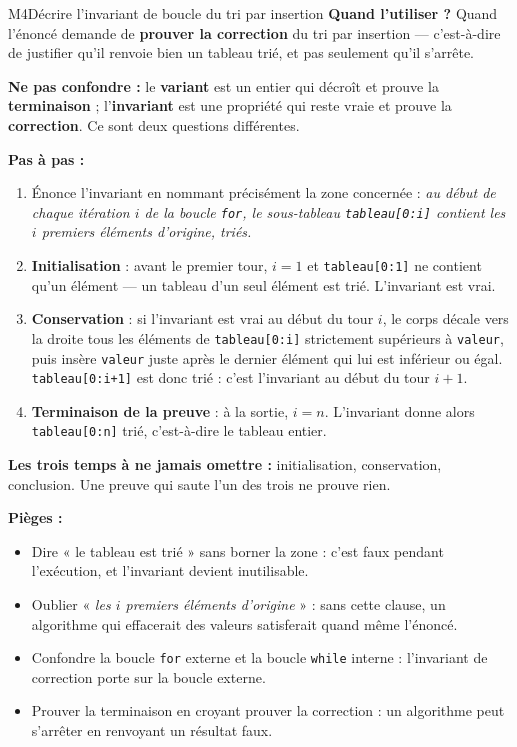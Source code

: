 \begin{fichemethode}{M4}{Décrire l'invariant de boucle du tri par insertion}
\textbf{Quand l'utiliser ?} Quand l'énoncé demande de \textbf{prouver la correction} du tri
par insertion — c'est-à-dire de justifier qu'il renvoie bien un tableau trié, et pas
seulement qu'il s'arrête.

\textbf{Ne pas confondre :} le \textbf{variant} est un entier qui décroît et prouve la
\textbf{terminaison} ; l'\textbf{invariant} est une propriété qui reste vraie et prouve la
\textbf{correction}. Ce sont deux questions différentes.

\textbf{Pas à pas :}
\begin{enumerate}
  \item Énonce l'invariant en nommant précisément la zone concernée : \emph{au début de
    chaque itération $i$ de la boucle \lstinline{for}, le sous-tableau
    \lstinline{tableau[0:i]} contient les $i$ premiers éléments d'origine, triés.}
  \item \textbf{Initialisation} : avant le premier tour, $i=1$ et \lstinline{tableau[0:1]}
    ne contient qu'un élément — un tableau d'un seul élément est trié. L'invariant est vrai.
  \item \textbf{Conservation} : si l'invariant est vrai au début du tour $i$, le corps
    décale vers la droite tous les éléments de \lstinline{tableau[0:i]} strictement
    supérieurs à \lstinline{valeur}, puis insère \lstinline{valeur} juste après le dernier
    élément qui lui est inférieur ou égal. \lstinline{tableau[0:i+1]} est donc trié : c'est
    l'invariant au début du tour $i+1$.
  \item \textbf{Terminaison de la preuve} : à la sortie, $i = n$. L'invariant donne alors
    \lstinline{tableau[0:n]} trié, c'est-à-dire le tableau entier.
\end{enumerate}

\textbf{Les trois temps à ne jamais omettre :} initialisation, conservation, conclusion.
Une preuve qui saute l'un des trois ne prouve rien.

\textbf{Pièges :}
\begin{itemize}
  \item Dire « le tableau est trié » sans borner la zone : c'est faux pendant l'exécution,
    et l'invariant devient inutilisable.
  \item Oublier « \emph{les $i$ premiers éléments d'origine} » : sans cette clause, un
    algorithme qui effacerait des valeurs satisferait quand même l'énoncé.
  \item Confondre la boucle \lstinline{for} externe et la boucle \lstinline{while} interne :
    l'invariant de correction porte sur la boucle externe.
  \item Prouver la terminaison en croyant prouver la correction : un algorithme peut
    s'arrêter en renvoyant un résultat faux.
\end{itemize}


\end{fichemethode}
